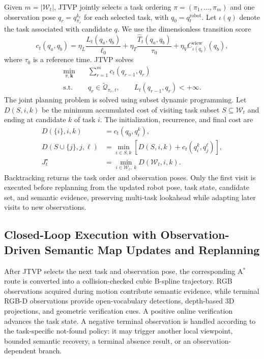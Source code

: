 \documentclass[letterpaper,10pt,conference]{ieeeconf}
\begin{document}
Given $m=|\mathcal W_t|$, JTVP jointly selects a task ordering $\pi=(\pi_1,\ldots,\pi_m)$ and one observation pose $q_r=q_{\pi_r}^{k_r}$ for each selected task, with $q_0=q_t^{\mathrm{robot}}$. Let $\iota(q)$ denote the task associated with candidate $q$. We use the dimensionless transition score
\begin{equation}
c_t(q_a,q_b)=
\eta_L\frac{L_t(q_a,q_b)}{\ell_0}
+\eta_T\frac{\widehat T_t(q_a,q_b)}{\tau_0}
+\eta_V C_{\iota(q_b)}^{\mathrm{view}}(q_b),
\label{eq:transition-score}
\end{equation}
where $\tau_0$ is a reference time. JTVP solves
\begin{equation}
\begin{aligned}
\min_{\pi,\mathbf k}\quad
&\sum_{r=1}^{m}c_t(q_{r-1},q_r)\\
\mathrm{s.t.}\quad
&q_r\in\widetilde{\mathcal Q}_{\pi_r,t},\qquad
L_t(q_{r-1},q_r)<+\infty .
\end{aligned}
\label{eq:jtvp}
\end{equation}
The joint planning problem is solved using subset dynamic programming. Let $D(S,i,k)$ be the minimum accumulated cost of visiting task subset $S\subseteq\mathcal W_t$ and ending at candidate $k$ of task $i$. The initialization, recurrence, and final cost are
\begin{equation}
\begin{aligned}
D(\{i\},i,k)&=c_t(q_0,q_i^k),\\
D(S\cup\{j\},j,\ell)&=
\min_{i\in S,k}\left[D(S,i,k)+c_t(q_i^k,q_j^\ell)\right],\\
J_t^\star&=\min_{i\in\mathcal W_t,\;k}D(\mathcal W_t,i,k).
\end{aligned}
\label{eq:subset-dp}
\end{equation}
Backtracking returns the task order and observation poses. Only the first visit is executed before replanning from the updated robot pose, task state, candidate set, and semantic evidence, preserving multi-task lookahead while adapting later visits to new observations.

\subsection{Closed-Loop Execution with Observation-Driven Semantic Map Updates and Replanning}
\label{sec:recovery}

After JTVP selects the next task and observation pose, the corresponding A$^*$ route is converted into a collision-checked cubic B-spline trajectory. RGB observations acquired during motion contribute semantic evidence, while terminal RGB-D observations provide open-vocabulary detections, depth-based 3D projections, and geometric verification cues. A positive online verification advances the task state. A negative terminal observation is handled according to the task-specific not-found policy: it may trigger another local viewpoint, bounded semantic recovery, a terminal absence result, or an observation-dependent branch.
\end{document}

